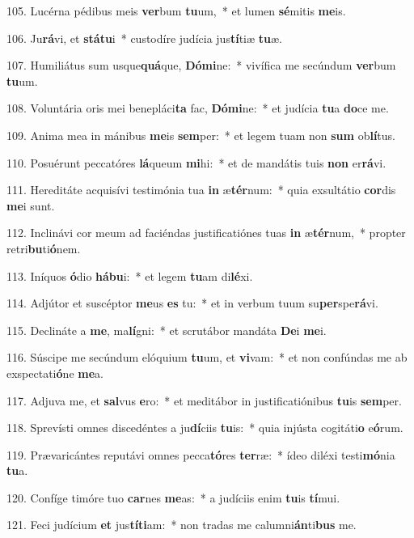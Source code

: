 105. Lucérna pédibus meis \textbf{ver}bum \textbf{tu}um,~*  et lumen \textbf{sé}mitis \textbf{me}is.\

106. Ju\textbf{rá}vi, et \textbf{stá}\textbf{tu}i~*  custodíre judícia jus\textbf{tí}tiæ \textbf{tu}æ.\

107. Humiliátus sum usque\textbf{quá}que, \textbf{Dó}\textbf{mi}ne:~*  vivífica me secúndum \textbf{ver}bum \textbf{tu}um.\

108. Voluntária oris mei benepláci\textbf{ta} fac, \textbf{Dó}\textbf{mi}ne:~*  et judícia \textbf{tu}a \textbf{do}ce me.\

109. Anima mea in mánibus \textbf{me}is \textbf{sem}per:~*  et legem tuam non \textbf{sum} ob\textbf{lí}tus.\

110. Posuérunt peccatóres \textbf{lá}queum \textbf{mi}hi:~*  et de mandátis tuis \textbf{non} er\textbf{rá}vi.\

111. Hereditáte acquisívi testimónia tua \textbf{in} æ\textbf{tér}num:~*  quia exsultátio \textbf{cor}dis \textbf{me}i sunt.\

112. Inclinávi cor meum ad faciéndas justificatiónes tuas \textbf{in} æ\textbf{tér}num,~*  propter retri\textbf{bu}ti\textbf{ó}nem.\

113. Iníquos \textbf{ó}dio \textbf{há}\textbf{bu}i:~*  et legem \textbf{tu}am di\textbf{lé}xi.\

114. Adjútor et suscéptor \textbf{me}us \textbf{es} tu:~*  et in verbum tuum su\textbf{per}spe\textbf{rá}vi.\

115. Declináte a \textbf{me}, ma\textbf{lí}gni:~*  et scrutábor mandáta \textbf{De}i \textbf{me}i.\

116. Súscipe me secúndum elóquium \textbf{tu}um, et \textbf{vi}vam:~*  et non confúndas me ab exspectati\textbf{ó}ne \textbf{me}a.\

117. Adjuva me, et \textbf{sal}vus \textbf{e}ro:~*  et meditábor in justificatiónibus \textbf{tu}is \textbf{sem}per.\

118. Sprevísti omnes discedéntes a ju\textbf{dí}ciis \textbf{tu}is:~*  quia injústa cogitáti\textbf{o} e\textbf{ó}rum.\

119. Prævaricántes reputávi omnes pecca\textbf{tó}res \textbf{ter}ræ:~*  ídeo diléxi testi\textbf{mó}nia \textbf{tu}a.\

120. Confíge timóre tuo \textbf{car}nes \textbf{me}as:~*  a judíciis enim \textbf{tu}is \textbf{tí}mui.\

121. Feci judícium \textbf{et} jus\textbf{tí}\textbf{ti}am:~*  non tradas me calumni\textbf{án}ti\textbf{bus} me.\

